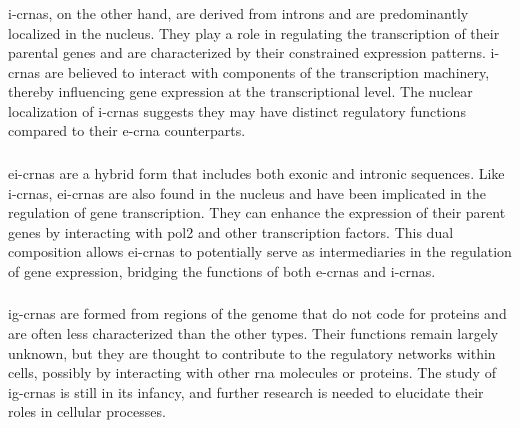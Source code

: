 \subsubsection{}

\Glspl{i-crna}, on the other hand, are derived
from introns and are predominantly localized in the
nucleus\supercite{das_identification_2020}.
They play a role in regulating the transcription of their parental genes and
are characterized by their constrained expression
patterns\supercite{panda_identification_2017}.
\Glspl{i-crna} are believed to interact with components of the transcription
machinery, thereby influencing gene expression at the transcriptional
level\supercite{wang_identification_2017}.
The nuclear localization of \glspl{i-crna} suggests they may have distinct
regulatory functions compared to their \gls{e-crna}
counterparts\supercite{veno_spatio-temporal_2015}.

\subsubsection{}

\Glspl{ei-crna} are a hybrid form that includes both exonic and intronic
sequences\supercite{li_exon-intron_2015}.
Like \glspl{i-crna}, \glspl{ei-crna} are also found in the nucleus and have
been implicated in the regulation of gene
transcription\supercite{ivanov_analysis_2015}.
They can enhance the expression of their parent genes by interacting with
\gls{pol2} and other transcription factors\supercite{song_circular_2016}.
This dual composition allows \glspl{ei-crna} to potentially serve as
intermediaries in the regulation of gene expression, bridging the functions of
both \glspl{e-crna} and \glspl{i-crna}\supercite{zhu_comprehensive_2018}.

\subsubsection{}

\Glspl{ig-crna} are formed from regions of the genome that do not code for
proteins and are often less characterized than the other
types\supercite{tang_genome-wide_2018}.
Their functions remain largely unknown, but they are thought to contribute to
the regulatory networks within cells, possibly by interacting with other
\gls{rna} molecules or proteins\supercite{huang_circular_2017}.
The study of \glspl{ig-crna} is still in its infancy, and further research is
needed to elucidate their roles in cellular
processes\supercite{wang_identification_2017}.

